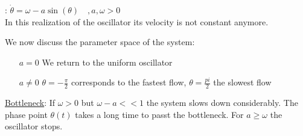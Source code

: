 \textbf{\underline{}}: $\dot{\theta}=\omega-a\sin(\theta)\quad ,a,\omega>0$\vspace{0.2cm}\\
In this realization of the oscillator its velocity is not constant anymore.
\begin{figure}[H]
	\centering
\end{figure}
We now discuss the parameter space of the system:
\begin{itemize}
	\item[$a=0$] We return to the uniform oscillator
	\item[$a\neq 0$] $\theta=-\frac{\pi}{2}$ corresponds to the fastest flow, $\theta=\frac{pi}{2}$ the slowest flow
\end{itemize}
\underline{Bottleneck}: If $\omega>0$ but $\omega -a<<1$ the system slows down considerably. The phase point $\theta(t)$ takes a long time to passt the bottleneck. For $a\geq\omega$ the oscillator stops.
